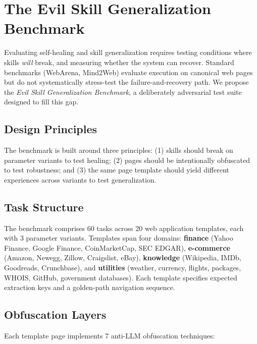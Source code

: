 \section{The Evil Skill Generalization Benchmark}
\label{sec:benchmark}

Evaluating self-healing and skill generalization requires testing conditions where skills \emph{will} break, and measuring whether the system can recover. Standard benchmarks (WebArena, Mind2Web) evaluate execution on canonical web pages but do not systematically stress-test the failure-and-recovery path. We propose the \emph{Evil Skill Generalization Benchmark}, a deliberately adversarial test suite designed to fill this gap.

\subsection{Design Principles}

The benchmark is built around three principles: (1) skills should break on parameter variants to test healing; (2) pages should be intentionally obfuscated to test robustness; and (3) the same page template should yield different experiences across variants to test generalization.

\subsection{Task Structure}

The benchmark comprises 60 tasks across 20 web application templates, each with 3 parameter variants. Templates span four domains: \textbf{finance} (Yahoo Finance, Google Finance, CoinMarketCap, SEC EDGAR), \textbf{e-commerce} (Amazon, Newegg, Zillow, Craigslist, eBay), \textbf{knowledge} (Wikipedia, IMDb, Goodreads, Crunchbase), and \textbf{utilities} (weather, currency, flights, packages, WHOIS, GitHub, government databases). Each template specifies expected extraction keys and a golden-path navigation sequence.

\subsection{Obfuscation Layers}

Each template page implements 7 anti-LLM obfuscation techniques:

